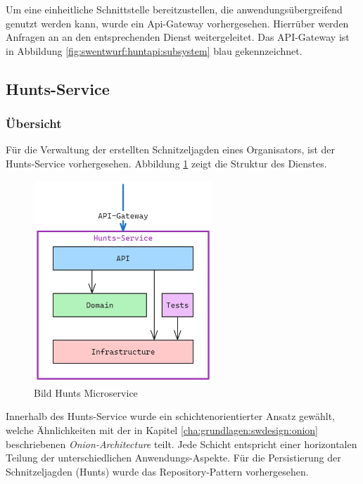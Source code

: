 Um eine einheitliche Schnittstelle bereitzustellen, die anwendungsübergreifend genutzt werden kann, wurde ein Api-Gateway vorhergesehen. Hierrüber werden Anfragen an an den entsprechenden Dienst weitergeleitet. Das API-Gateway ist in Abbildung \ref{fig:swentwurf:huntapi:subsystem} blau gekennzeichnet.

\subsection{Hunts-Service} \label{cha:swentwurf:huntsservice}

\subsubsection{Übersicht}

Für die Verwaltung der erstellten Schnitzeljagden eines Organisators, ist der Hunts-Service vorhergesehen. Abbildung \ref{fig:swentwurf:huntapi:huntservice} zeigt die Struktur des Dienstes.

\begin{figure}[H]
    \centering
    \includegraphics[width=0.6\textwidth]{images/PrAr-Software-Entwurf-Hunt-Api-Hunt-Service.png}
    \caption{Bild Hunts Microservice}
    \label{fig:swentwurf:huntapi:huntservice}
\end{figure}

Innerhalb des Hunts-Service wurde ein schichtenorientierter Ansatz gewählt, welche Ähnlichkeiten mit der in Kapitel \ref{cha:grundlagen:swdesign:onion} beschriebenen \textit{Onion-Architecture} teilt. Jede Schicht entspricht einer horizontalen Teilung der unterschiedlichen Anwendungs-Aspekte. Für die Persistierung der Schnitzeljagden (Hunts) wurde das Repository-Pattern vorhergesehen.

